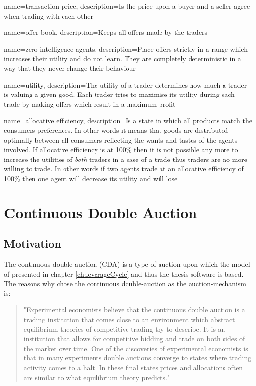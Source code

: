 \documentclass[../Bachelorarbeit.tex]{subfiles}
\begin{document}
 {
	name=transaction-price,
	description={Is the price upon a buyer and a seller agree when trading with each other}
}

 {
	name=offer-book,
	description={Keeps all offers made by the traders}
}

 {
	name=zero-intelligence agents,
	description={Place offers strictly in a range which increases their utility and do not learn. They are completely deterministic in a way that they never change their behaviour}
}

 {
	name=utility,
	description={The utility of a trader determines how much a trader is valuing a given good. Each trader tries to maximise its utility during each trade by making offers which result in a maximum profit}
}

 {
	name=allocative efficiency,
	description={Is a state in which all products match the consumers preferences. In other words it means that goods are distributed optimally between all consumers reflecting the wants and tastes of the agents involved. If allocative efficiency is at 100\% then it is not possible any more to increase the utilities of \textit{both} traders in a case of a trade thus traders are no more willing to trade. In other words if two agents trade at an allocative efficiency of 100\% then one agent will decrease its utility and will lose}
}

\section{Continuous Double Auction}	

\subsection{Motivation}
The continuous double-auction (CDA) is a type of auction upon which the model of \cite{Breuer2015} presented in chapter \ref{ch:leverageCycle} and thus the thesis-software is based. The reasons why \cite{Breuer2015} chose the continuous double-auction as the auction-mechanism is:

\begin{quote}
"Experimental economists believe that the continuous double auction is a trading institution that comes close to an environment which abstract equilibrium theories of competitive trading try to describe. It is an institution that allows for competitive bidding and trade on both sides of the market over time. One of the discoveries of experimental economists is that in many experiments double auctions converge to states where trading activity comes to a halt. In these final states prices and allocations often are similar to what equilibrium theory predicts."
\end{quote}
\end{document}
